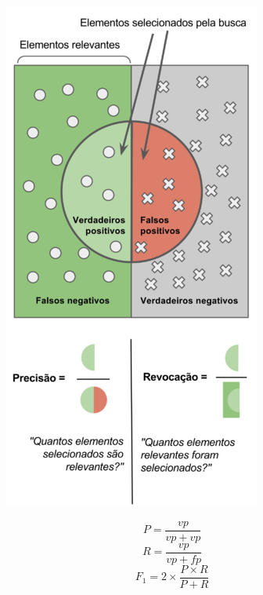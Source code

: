 \begin{figure}[!ht]
    \centering
    \begin{minipage}[c]{0.4\textwidth}
        \includegraphics[width=\columnwidth]{
            Imagens/Precisão_e_revocação.png
        }
    \end{minipage}%
    \begin{minipage}{0.5\textwidth}
        \begin{equation} P = \frac{vp}{vp + vp} \end{equation}
        \begin{equation}R = \frac{vp}{vp + fp}\end{equation}
        \begin{equation}F_1 = 2 \times \frac {P \times R}{P + R}\end{equation}
                

\end{minipage}
\end{figure}
